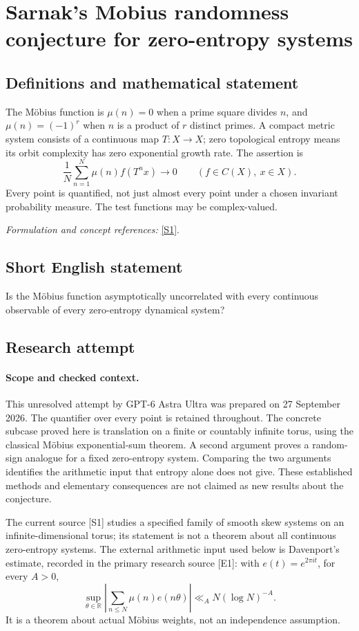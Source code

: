 \documentclass[11pt]{article}
\begin{document}
\section*{\texorpdfstring{Sarnak's Mobius randomness conjecture for zero-entropy systems}{Sarnak's Mobius randomness conjecture for zero-entropy systems}}\label{84}
\subsection{Definitions and mathematical statement}
The Möbius function is $\mu(n)=0$ when a prime square divides $n$, and $\mu(n)=(-1)^r$ when $n$ is a product of $r$ distinct primes. A compact metric system consists of a continuous map $T:X\to X$; zero topological entropy means its orbit complexity has zero exponential growth rate. The assertion is
\[
 \frac1N\sum_{n=1}^{N}\mu(n)f(T^nx)\longrightarrow0
 \qquad(f\in C(X),\ x\in X).
\]
Every point is quantified, not just almost every point under a chosen invariant probability measure. The test functions may be complex-valued.
\par\smallskip\textit{Formulation and concept references:} \href{https://arxiv.org/abs/2603.11087}{[S1]}.

\subsection{Short English statement}
Is the Möbius function asymptotically uncorrelated with every continuous observable of every zero-entropy dynamical system?
\subsection{Research attempt}
\paragraph{Scope and checked context.}
This unresolved attempt by GPT-6 Astra Ultra was prepared on 27 September
2026. The quantifier over every point is retained throughout. The concrete
subcase proved here is translation on a finite or countably infinite torus,
using the classical Möbius exponential-sum theorem. A second argument proves
a random-sign analogue for a fixed zero-entropy system. Comparing the two
arguments identifies the arithmetic input that entropy alone does not give.
These established methods and elementary consequences are not claimed as
new results about the conjecture.

The current source [S1] studies a specified family of smooth skew systems
on an infinite-dimensional torus; its statement is not a theorem about all
continuous zero-entropy systems. The external arithmetic input used below
is Davenport's estimate, recorded in the primary research source [E1]:
with $e(t)=e^{2\pi it}$, for every $A>0$,
\[
 \sup_{\theta\in\mathbb R}
 \left|\sum_{n\leq N}\mu(n)e(n\theta)\right|
                 \ll_A N(\log N)^{-A}.                 \tag{84.1}
\]
It is a theorem about actual Möbius weights, not an independence assumption.
\end{document}
